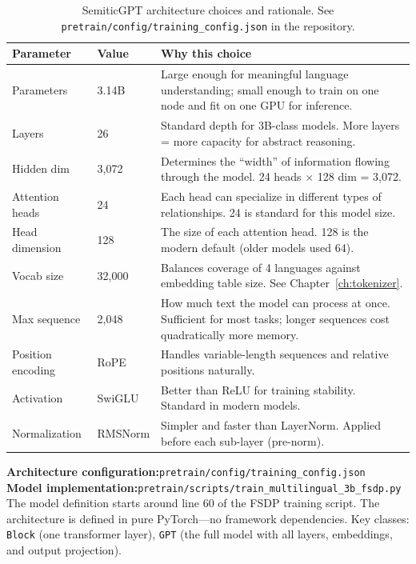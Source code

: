 \documentclass[11pt,a4paper]{article}
\begin{document}
\begin{table}[H]
\centering
\begin{tabular}{llp{7cm}}
\toprule
\textbf{Parameter} & \textbf{Value} & \textbf{Why this choice} \\
\midrule
Parameters & 3.14B & Large enough for meaningful language understanding; small enough to train on one node and fit on one GPU for inference. \\
Layers & 26 & Standard depth for 3B-class models. More layers = more capacity for abstract reasoning. \\
Hidden dim & 3,072 & Determines the ``width'' of information flowing through the model. 24 heads $\times$ 128 dim = 3,072. \\
Attention heads & 24 & Each head can specialize in different types of relationships. 24 is standard for this model size. \\
Head dimension & 128 & The size of each attention head. 128 is the modern default (older models used 64). \\
Vocab size & 32,000 & Balances coverage of 4 languages against embedding table size. See Chapter~\ref{ch:tokenizer}. \\
Max sequence & 2,048 & How much text the model can process at once. Sufficient for most tasks; longer sequences cost quadratically more memory. \\
Position encoding & RoPE & Handles variable-length sequences and relative positions naturally. \\
Activation & SwiGLU & Better than ReLU for training stability. Standard in modern models. \\
Normalization & RMSNorm & Simpler and faster than LayerNorm. Applied before each sub-layer (pre-norm). \\
\bottomrule
\end{tabular}
\caption{SemiticGPT architecture choices and rationale. See \texttt{pretrain/config/training\_config.json} in the repository.}
\label{tab:arch_choices}
\end{table}

\begin{reporef}
\textbf{Architecture configuration:}\hfill\texttt{pretrain/config/training\_config.json}\\
\textbf{Model implementation:}\hfill\texttt{pretrain/scripts/train\_multilingual\_3b\_fsdp.py}\\

The model definition starts around line 60 of the FSDP training script. The architecture is defined in pure PyTorch---no framework dependencies. Key classes: \texttt{Block} (one transformer layer), \texttt{GPT} (the full model with all layers, embeddings, and output projection).
\end{reporef}
\end{document}
